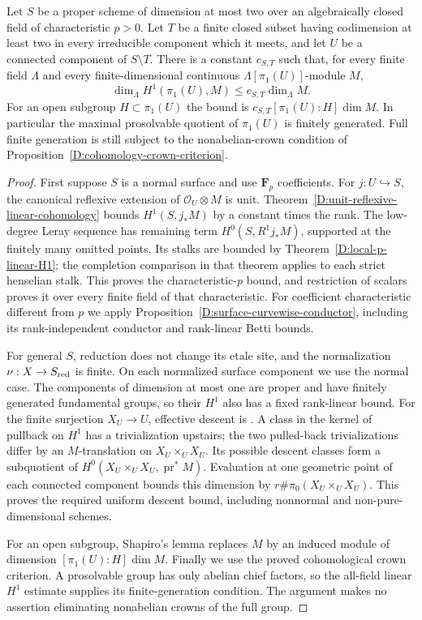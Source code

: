 \begin{theorem}
\label{D:punctured-surface-all-characteristics-H1}
Let $S$ be a proper scheme of dimension at most two over an algebraically
closed field of characteristic $p>0$. Let $T$ be a finite closed subset
having codimension at least two in every irreducible component which it
meets, and let $U$ be a connected component of $S\setminus T$. There is
a constant $c_{S,T}$ such that, for every finite field $\Lambda$ and
every finite-dimensional continuous $\Lambda[\pi_1(U)]$-module $M$,
\[
 \dim_\Lambda H^1(\pi_1(U),M)\le c_{S,T}\dim_\Lambda M.
\]
For an open subgroup $H\subset\pi_1(U)$ the bound is
$c_{S,T}[\pi_1(U):H]\dim M$. In particular the maximal prosolvable
quotient of $\pi_1(U)$ is finitely generated. Full finite generation is
still subject to the nonabelian-crown condition of
Proposition~\ref{D:cohomology-crown-criterion}.
\end{theorem}
\begin{proof}
First suppose $S$ is a normal surface and use $\mathbf F_p$ coefficients.
For $j:U\hookrightarrow S$, the canonical reflexive extension of
$\mathcal O_U\otimes M$ is unit. Theorem~\ref{D:unit-reflexive-linear-cohomology}
bounds $H^1(S,j_*M)$ by a constant times the rank. The low-degree Leray
sequence has remaining term $H^0(S,R^1j_*M)$, supported at the finitely
many omitted points. Its stalks are bounded by
Theorem~\ref{D:local-p-linear-H1}; the completion comparison in that
theorem applies to each strict henselian stalk. This proves the
characteristic-$p$ bound, and restriction of scalars proves it over
every finite field of that characteristic. For coefficient characteristic
different from $p$ we apply
Proposition~\ref{D:surface-curvewise-conductor}, including its
rank-independent conductor and rank-linear Betti bounds.

For general $S$, reduction does not change its etale site, and the
normalization $\nu:X\to S_{\rm red}$ is finite. On each normalized
surface component we use the normal case. The components of dimension
at most one are proper and have finitely generated fundamental groups,
so their $H^1$ also has a fixed rank-linear bound. For the finite
surjection $X_U\to U$, effective descent is
\citet[Expose IX, Theorem 4.7]{C_SGA1}. A class in the kernel of pullback
on $H^1$ has a trivialization upstairs; the two pulled-back
trivializations differ by an $M$-translation on
$X_U\times_U X_U$. Its possible descent classes form a subquotient of
$H^0(X_U\times_U X_U,\operatorname{pr}^*M)$. Evaluation at one geometric
point of each connected component bounds this dimension by
$r\#\pi_0(X_U\times_U X_U)$. This proves the required uniform descent
bound, including nonnormal and non-pure-dimensional schemes.

For an open subgroup, Shapiro's lemma replaces $M$ by an induced module
of dimension $[\pi_1(U):H]\dim M$. Finally we use the proved
cohomological crown criterion. A prosolvable group has only abelian
chief factors, so the all-field linear $H^1$ estimate supplies its
finite-generation condition. The argument makes no assertion eliminating
nonabelian crowns of the full group.
\end{proof}
